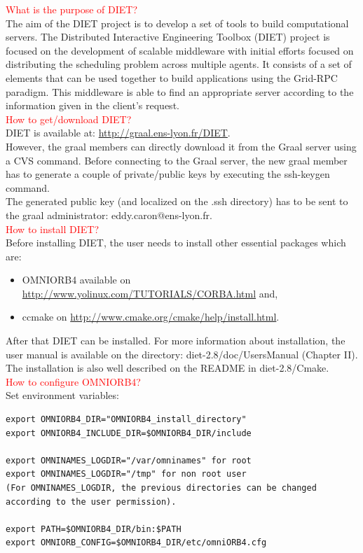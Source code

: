 \documentclass[12pt,a4paper]{book}
\newcommand{\dietversion}{2.8}
\begin{document}
\noindent \textcolor{red}{What is the purpose of DIET?}\\
The aim of the DIET project is to develop a set of tools to build computational servers. 
The Distributed Interactive Engineering Toolbox (DIET) project is focused on the development of scalable middleware with initial efforts focused on distributing the scheduling 
problem across multiple agents. It consists of a set of elements that can be used together to build applications using the Grid-RPC paradigm. 
This middleware is able to find an appropriate server according to the information given in the client's request.\\

\noindent \textcolor{red}{How to get/download DIET?}\\
DIET is available at: \url{http://graal.ens-lyon.fr/DIET}.\\
  
\noindent However, the graal members can directly download it from the Graal server using a CVS command. Before connecting to the Graal server, the new graal member has to generate a couple
of private/public keys by executing the ssh-keygen command.\\
The generated public key (and localized on the .ssh directory) has to be sent to the graal administrator: eddy.caron@ens-lyon.fr.\\
 
\noindent \textcolor{red}{How to install DIET?}\\
Before installing DIET, the user needs to install other essential packages which are: 

\begin{itemize}
 \item OMNIORB4 available on \url{http://www.yolinux.com/TUTORIALS/CORBA.html} and,
 \item ccmake on \url{http://www.cmake.org/cmake/help/install.html}.\\
\end{itemize}

\noindent After that DIET can be installed. For more information about installation, the user manual is available on the directory: diet-\dietversion/doc/UsersManual (Chapter II). The installation is also well described on the README in diet-\dietversion/Cmake.\\ 
  
\noindent \textcolor{red}{How to configure OMNIORB4?}\\
Set environment variables:
\begin{verbatim}
export OMNIORB4_DIR="OMNIORB4_install_directory"
export OMNIORB4_INCLUDE_DIR=$OMNIORB4_DIR/include

export OMNINAMES_LOGDIR="/var/omninames" for root 
export OMNINAMES_LOGDIR="/tmp" for non root user 
(For OMNINAMES_LOGDIR, the previous directories can be changed according to the user permission).
 
export PATH=$OMNIORB4_DIR/bin:$PATH
export OMNIORB_CONFIG=$OMNIORB4_DIR/etc/omniORB4.cfg 
\end{verbatim}
\end{document}
